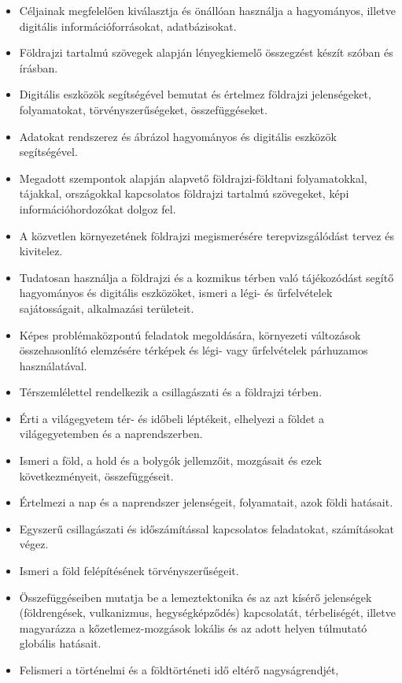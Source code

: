 \begin{itemize}
\item
  Céljainak megfelelően kiválasztja és önállóan használja a hagyományos,
  illetve digitális információforrásokat, adatbázisokat.
\item
  Földrajzi tartalmú szövegek alapján lényegkiemelő összegzést készít
  szóban és írásban.
\item
  Digitális eszközök segítségével bemutat és értelmez földrajzi
  jelenségeket, folyamatokat, törvényszerűségeket, összefüggéseket.
\item
  Adatokat rendszerez és ábrázol hagyományos és digitális eszközök
  segítségével.
\item
  Megadott szempontok alapján alapvető földrajzi-földtani folyamatokkal,
  tájakkal, országokkal kapcsolatos földrajzi tartalmú szövegeket, képi
  információhordozókat dolgoz fel.
\item
  A közvetlen környezetének földrajzi megismerésére terepvizsgálódást
  tervez és kivitelez.
\item
  Tudatosan használja a földrajzi és a kozmikus térben való tájékozódást
  segítő hagyományos és digitális eszközöket, ismeri a légi- és
  űrfelvételek sajátosságait, alkalmazási területeit.
\item
  Képes problémaközpontú feladatok megoldására, környezeti változások
  összehasonlító elemzésére térképek és légi- vagy űrfelvételek
  párhuzamos használatával.
\item
  Térszemlélettel rendelkezik a csillagászati és a földrajzi térben.
\item
  Érti a világegyetem tér- és időbeli léptékeit, elhelyezi a földet a
  világegyetemben és a naprendszerben.
\item
  Ismeri a föld, a hold és a bolygók jellemzőit, mozgásait és ezek
  következményeit, összefüggéseit.
\item
  Értelmezi a nap és a naprendszer jelenségeit, folyamatait, azok földi
  hatásait.
\item
  Egyszerű csillagászati és időszámítással kapcsolatos feladatokat,
  számításokat végez.
\item
  Ismeri a föld felépítésének törvényszerűségeit.
\item
  Összefüggéseiben mutatja be a lemeztektonika és az azt kísérő
  jelenségek (földrengések, vulkanizmus, hegységképződés) kapcsolatát,
  térbeliségét, illetve magyarázza a kőzetlemez-mozgások lokális és az
  adott helyen túlmutató globális hatásait.
\item
  Felismeri a történelmi és a földtörténeti idő eltérő nagyságrendjét,

\end{itemize}
